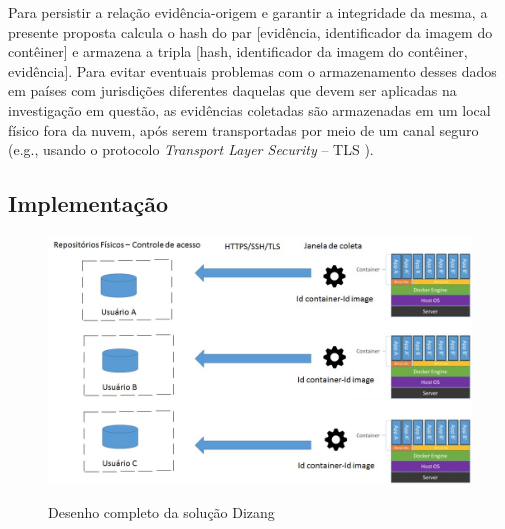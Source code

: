\documentclass[conference]{IEEEtran}
\newcommand{\marcosT}[1]{{\color{red}{TODO: #1}}}
\begin{document}
Para persistir a relação evidência-origem e garantir a integridade da mesma, a presente proposta calcula o hash do par [evidência, identificador da imagem do contêiner] e armazena a tripla [hash, identificador da imagem do contêiner, evidência].
%
Para evitar eventuais problemas com o armazenamento desses dados em países com jurisdições diferentes daquelas que devem ser aplicadas na investigação em questão, as evidências coletadas são armazenadas em um local físico fora da nuvem, após serem transportadas por meio de um canal seguro (e.g., usando o protocolo \textit{Transport Layer Security} -- TLS \cite{DierksT2008}).
%

%

\subsection{Implementação}
\label{sec:proposal-impl}


\begin{figure}[htb!]
\caption{Desenho completo da solução Dizang}
\includegraphics[scale=0.25]{solucao.jpg}
\label{fig:Solucao}
\end{figure}
\end{document}
